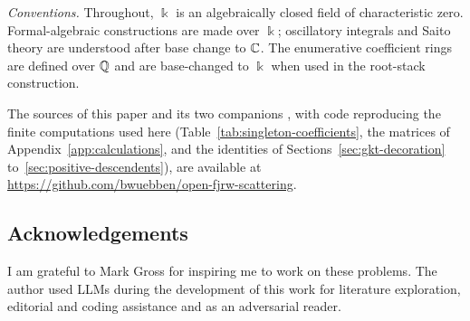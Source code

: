 \emph{Conventions.}  Throughout, $\Bbbk$ is an algebraically closed field of
characteristic zero.  Formal-algebraic constructions are made over $\Bbbk$;
oscillatory integrals and Saito theory \cite{saito1983period} are understood
after base change to $\mathbb C$.  The enumerative coefficient rings are defined
over $\mathbb Q$ and are base-changed to $\Bbbk$ when used in the root-stack
construction.

The sources of this paper and its two companions
\cite{wuebben2026threshold,wuebben2026boundary}, with code reproducing the
finite computations used here (Table~\ref{tab:singleton-coefficients}, the
matrices of Appendix~\ref{app:calculations}, and the identities of
Sections~\ref{sec:gkt-decoration} to~\ref{sec:positive-descendents}), are
available at \url{https://github.com/bwuebben/open-fjrw-scattering}.

\subsection*{Acknowledgements}
I am grateful to Mark Gross for inspiring me to work on these problems.
The author used LLMs during the development of this work for literature exploration, editorial and coding assistance and as an adversarial reader.
